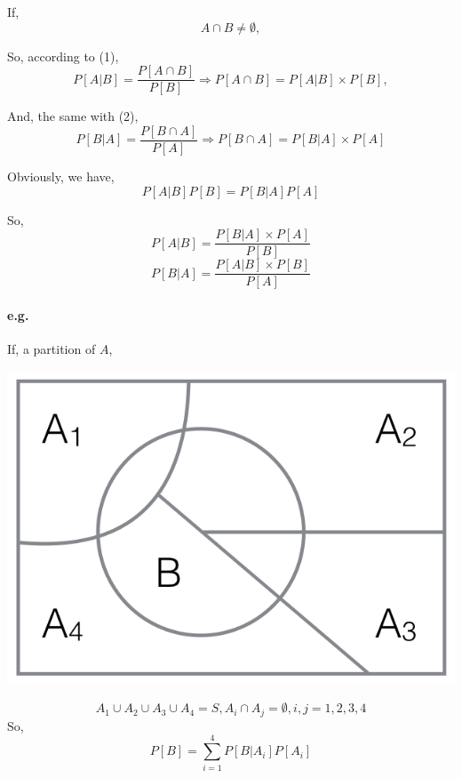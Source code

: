 \documentclass{article}
\begin{document}
{{{        If,
        \begin{equation}
            A \cap B \neq \emptyset, 
        \end{equation}
        
        So, according to (1),
        \begin{equation}
            P[A|B]= \frac{P[A \cap B]}{P[B]} \Rightarrow P[A \cap B] = P[A|B] \times P[B],
        \end{equation}

        And, the same with (2),
        \begin{equation}
            P[B|A]= \frac{P[B \cap A]}{P[A]} \Rightarrow P[B \cap A] = P[B|A] \times P[A]
        \end{equation}

        Obviously, we have,
        \begin{equation}
            P[A|B]P[B] = P[B|A]P[A]
        \end{equation}

        So,  
        \[P[A|B] = \frac{P[B|A] \times P[A]}{P[B]}\]
        \[P[B|A] = \frac{P[A|B] \times P[B]}{P[A]}\]

        \paragraph{e.g.}{
            If, a partition of $A$,
            \begin{center}{
                \includegraphics[scale=0.5]{bayes-eg.png}
            }
            \end{center}

            \[A_1 \cup A_2 \cup A_3 \cup A_4 = S, A_i \cap A_j = \emptyset, i,j=1,2,3,4\]
            So,
            \[P[B] = \sum_{i=1}^{4}P[B|A_i]P[A_i]\]
        }

}}}
\end{document}

